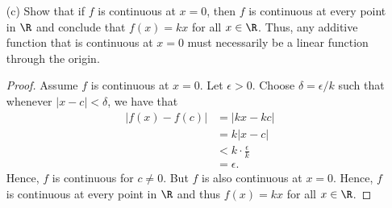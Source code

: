\begin{enumerate}
\begin{proof}
    \begin{align*}
        f(m/n) &= f \Big( \frac{ 1 }{ n } + \frac{ 1 }{ n } + \dots + \frac{ 1 }{ n }  \Big) \\
               &= m f \Big( \frac{ 1 }{ n }  \Big) \\ 
               &= k \Big( \frac{ m }{ n }  \Big). \\
    \end{align*}
    We can prove that this holds for any rational number \( r < 0  \) by using a similar strategy to the used to prove the negative integers case above.
        \end{proof}
    \item[(c)] Show that if \( f \) is continuous at \( x = 0  \), then \( f \) is continuous at every point in \( \R  \) and conclude that \( f(x) = k x  \) for all \( x \in \R  \). Thus, any additive function that is continuous at \( x = 0  \) must necessarily be a linear function through the origin.
        \begin{proof}
        Assume \( f \) is continuous at \( x = 0  \). Let \( \epsilon > 0  \). Choose \( \delta = \epsilon / k  \) such that whenever \( | x - c  | < \delta  \), we have that 
        \begin{align*}
            | f(x) - f(c) | &= | kx - kc  |  \\
                            &= k | x - c  | \\
                            &< k \cdot \frac{ \epsilon  }{  k } \\
                            &= \epsilon.
        \end{align*}
        Hence, \( f  \) is continuous for \( c \neq 0  \). But \( f \) is also continuous at \( x = 0  \). Hence, \( f \) is continuous at every point in \( \R  \) and thus \( f(x) = kx \) for all \( x \in \R  \).
        \end{proof}
\end{enumerate}






